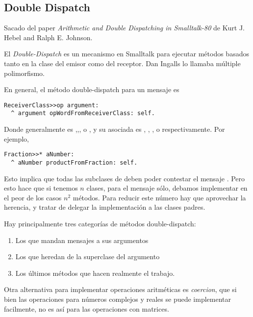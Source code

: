 \subsection{Double Dispatch}

Sacado del paper \emph{Arithmetic and Double Dispatching in Smalltalk-80} de Kurt J. Hebel and Ralph E. Johnson. 

El \emph{Double-Dispatch} es un mecanismo en Smalltalk para ejecutar m\'etodos basados tanto en la clase del emisor como del receptor. Dan Ingalls lo llamaba m\'ultiple polimorfismo. 

En general, el m\'etodo double-dispatch para un mensaje  es

\begin{verbatim}
ReceiverClass>>op argument:
  ^ argument opWordFromReceiverClass: self.
\end{verbatim}

Donde  generalmente es \code{+},\code{-},\code{*},\code{/} o \code{=}, y su  asociada es , , ,  o  respectivamente. Por ejemplo, 

\begin{verbatim}
Fraction>>* aNumber:
  ^ aNumber productFromFraction: self.
\end{verbatim}

Esto implica que todas las subclases de  deben poder contestar el mensaje . Pero esto hace que si tenemos $n$ clases, para el mensaje \code{*} s\'olo, debamos implementar en el peor de los casos $n^2$ m\'etodos. Para reducir este n\'umero hay que aprovechar la herencia, y tratar de delegar la implementaci\'on a las clases padres. 

Hay principalmente tres categor\'ias de m\'etodos double-dispatch:

\begin{enumerate}
 \item Los que mandan mensajes a sus argumentos
 \item Los que heredan de la superclase del argumento
 \item Los \'ultimos m\'etodos que hacen realmente el trabajo. 
\end{enumerate}

Otra alternativa para implementar operaciones aritm\'eticas es \emph{coercion}, que si bien las operaciones para n\'umeros complejos y reales se puede implementar facilmente, no es as\'i para las operaciones con matrices. 